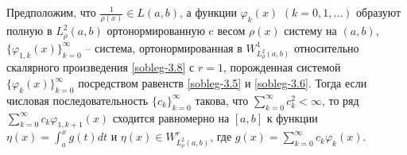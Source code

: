\begin{corollary}
Предположим, что  $ \frac{1}{\rho(x)}\in L(a,b) $, а  функции $\varphi_k(x)$ $(k=0,1,\ldots)$  образуют полную в $L^2_\rho(a,b)$ ортонормированную   c весом   $\rho(x)$ систему на $(a,b)$, $\{\varphi_{1,k}(x)\}_{k=0}^\infty$ -- система, ортонормированная в $W^1_{L^2_\rho(a,b)}$ относительно скалярного произведения \eqref{sobleg-3.8} с $r=1$,  порожденная системой $\{\varphi_{k}(x)\}_{k=0}^\infty$ посредством равенств \eqref{sobleg-3.5} и \eqref{sobleg-3.6}.
Тогда если числовая последовательность $\{c_k\}_{k=0}^\infty$ такова, что $\sum_{k=0}^\infty c_k^2<\infty$, то  ряд  $\sum_{k=0}^\infty c_k\varphi_{1,k+1}(x)$ сходится равномерно на $[a,b]$ к функции $\eta(x)=\int_a^x g(t)dt$ и  $\eta(x)\in W^r_{L^2_\rho(a,b)}$, где $g(x)=\sum_{k=0}^\infty c_k\varphi_{k}(x)$.
\end{corollary}
%
%
%
%
%
%

